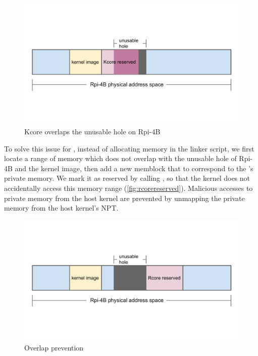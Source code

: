 \begin{figure}[hbtp]
    \includegraphics[scale=0.60]{figures/overlap.pdf}
    \caption{Kcore overlaps the unusable hole on Rpi-4B}
    \label{fig:overlap}
\end{figure}

To solve this issue for \rustsec{}, instead of allocating memory in the linker
script, we first locate a range of memory which does not overlap with the
unusable hole of Rpi-4B and the kernel image, then add a new memblock that to
correspond to the \rustcore{}'s private memory. We mark it as reserved by
calling , so that the kernel does not accidentally
access this memory range (\autoref{fig:rcorereserved}). Malicious accesses to
\rustcore{} private memory from the host kernel are prevented by unmapping the
private memory from the host kernel's NPT.

\begin{figure}[H]
    \includegraphics[scale=0.60]{figures/rcore_reserved.pdf}
    \caption{Overlap prevention}
    \label{fig:rcorereserved}
\end{figure}

